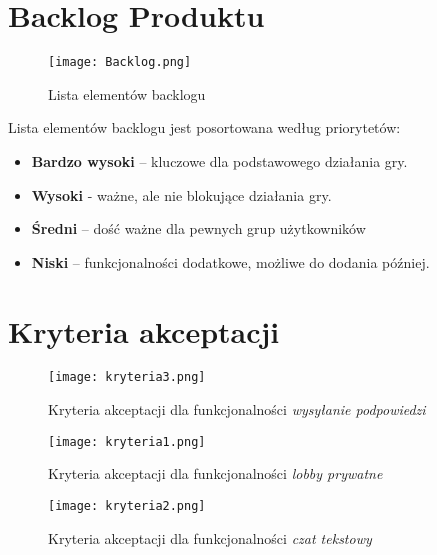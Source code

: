\documentclass[12pt,a4paper,colorlinks=true,linkcolor=NavyBlue,citecolor=red,urlcolor=NavyBlue]{book}
\begin{document}
\vspace{1cm}
\section{Backlog Produktu}
\begin{figure}[h!]
    \centering
    \vspace{0.5cm}
    \texttt{[image: Backlog.png]} 
    \caption{Lista elementów backlogu}
    \label{fig:backlog}
\end{figure}

\vspace{1cm}
{\large Lista elementów backlogu jest posortowana według priorytetów:}
\begin{itemize}
    \item \textbf{Bardzo wysoki} – kluczowe dla podstawowego działania gry.
    \item \textbf{Wysoki} - ważne, ale nie blokujące działania gry.
    \item \textbf{Średni} – dość ważne dla pewnych grup użytkowników
    \item \textbf{Niski} – funkcjonalności dodatkowe, możliwe do dodania później.
\end{itemize}



\newpage
\section{Kryteria akceptacji}

\begin{figure}[h!]
    \centering
    \texttt{[image: kryteria3.png]} 
    \caption{Kryteria akceptacji dla funkcjonalności \textit{wysyłanie podpowiedzi}}
\end{figure}

\begin{figure}[h!]
    \centering
    \vspace{1cm}
    \texttt{[image: kryteria1.png]}
    \caption{Kryteria akceptacji dla funkcjonalności \textit{lobby prywatne}}
    \vspace{1cm}
\end{figure}

\begin{figure}[h!]
    \centering
    \vspace{1cm}
    \texttt{[image: kryteria2.png]}
    \caption{Kryteria akceptacji dla funkcjonalności \textit{czat tekstowy}}
    \vspace{1cm}
\end{figure}
\end{document}
